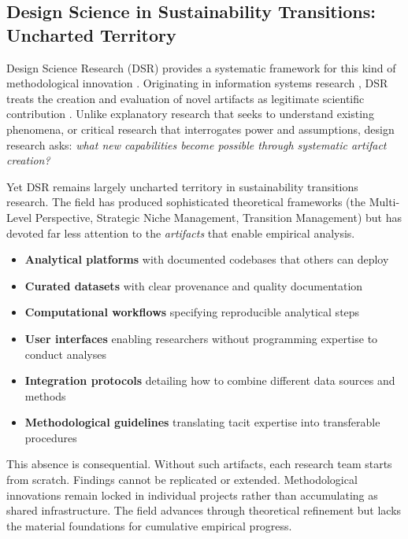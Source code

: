 \documentclass[../main.tex]{subfiles}
\begin{document}
\subsection{Design Science in Sustainability Transitions: Uncharted Territory}

Design Science Research (DSR) provides a systematic framework for this kind of methodological innovation . Originating in information systems research \cite{march1995design}, DSR treats the creation and evaluation of novel artifacts as legitimate scientific contribution \cite{peffers2007dsr}. Unlike explanatory research that seeks to understand existing phenomena, or critical research that interrogates power and assumptions, design research asks: \emph{what new capabilities become possible through systematic artifact creation?}

Yet DSR remains largely uncharted territory in sustainability transitions research. The field has produced sophisticated theoretical frameworks (the Multi-Level Perspective, Strategic Niche Management, Transition Management) but has devoted far less attention to the \emph{artifacts} that enable empirical analysis.

\begin{itemize}[leftmargin=*, itemsep=0.3em]
\item \textbf{Analytical platforms} with documented codebases that others can deploy
\item \textbf{Curated datasets} with clear provenance and quality documentation
\item \textbf{Computational workflows} specifying reproducible analytical steps
\item \textbf{User interfaces} enabling researchers without programming expertise to conduct analyses
\item \textbf{Integration protocols} detailing how to combine different data sources and methods
\item \textbf{Methodological guidelines} translating tacit expertise into transferable procedures
\end{itemize}

This absence is consequential. Without such artifacts, each research team starts from scratch. Findings cannot be replicated or extended. Methodological innovations remain locked in individual projects rather than accumulating as shared infrastructure. The field advances through theoretical refinement but lacks the material foundations for cumulative empirical progress.
\end{document}
